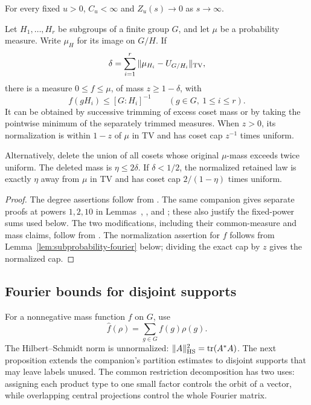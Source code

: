 \begin{proposition}
\label{shear:prop:fourier-inputs}
For every fixed \(u>0\), \(C_u<\infty\) and \(Z_u(s)\to0\) as \(s\to\infty\).

Let \(H_1,\ldots,H_r\) be subgroups of a finite group \(G\), and let
\(\mu\) be a probability measure. Write \(\mu_H\) for its image on
\(G/H\). If
\[
 \delta=\sum_{i=1}^r
 \|\mu_{H_i}-U_{G/H_i}\|_{\mathrm{TV}},
\]
there is a measure \(0\le f\le\mu\), of mass \(z\ge1-\delta\), with
\[
 f(gH_i)\le [G:H_i]^{-1}\qquad(g\in G,\ 1\le i\le r).
\]
It can be obtained by successive trimming of excess coset mass or by
taking the pointwise minimum of the separately trimmed measures.
When \(z>0\), its normalization is within \(1-z\) of \(\mu\) in TV and
has coset cap \(z^{-1}\) times uniform.

Alternatively, delete the union of all cosets whose original \(\mu\)-mass
exceeds twice uniform. The deleted mass is \(\eta\le2\delta\).
If \(\delta<1/2\), the normalized retained law is exactly \(\eta\) away
from \(\mu\) in TV and has coset cap \(2/(1-\eta)\) times uniform.
\end{proposition}
\begin{proof}
The degree assertions follow from
\cite[Theorem~]{partial-fourier}.
The same companion gives separate proofs at powers \(1,2,10\) in
Lemmas~,
, and ;
these also justify the fixed-power sums used below.
The two modifications, including their common-measure and mass claims,
follow from \cite[Lemma~]{partial-fourier}.
The normalization assertion for \(f\) follows from
Lemma~\ref{lem:subprobability-fourier} below; dividing the exact cap
by \(z\) gives the normalized cap.
\end{proof}

\subsection{Fourier bounds for disjoint supports}

For a nonnegative mass function \(f\) on \(G\), use
\[
 \widehat f(\rho)=\sum_{g\in G}f(g)\rho(g).
\]
The Hilbert--Schmidt norm is unnormalized:
\(\|A\|_{\mathrm{HS}}^2=\operatorname{tr}(A^*A)\).
The next proposition extends the companion's partition estimates to
disjoint supports that may leave labels unused. The common restriction
decomposition has two uses: assigning each product type to one small
factor controls the orbit of a vector, while overlapping central
projections control the whole Fourier matrix.

